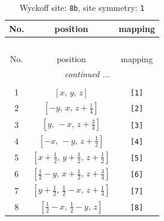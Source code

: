 \documentclass[fleqn,8pt]{jsarticle}
\begin{document}
\begin{longtable}{ccc}
\caption{Wyckoff site: {\tt 8b}, site symmetry: {\tt 1}}
 \\
 \hline \hline
No. & position & mapping \\ \hline \endfirsthead

\multicolumn{2}{l}{\tablename\ \thetable{}} \\
 \hline \hline
No. & position & mapping \\ \hline \endhead

 \hline \hline
\multicolumn{2}{r}{\footnotesize\it continued ...} \\ \endfoot

 \hline \hline
\multicolumn{2}{r}{} \\ \endlastfoot

1 & $\left[ x,\, y,\, z \right]$ & {\tt [1]} \\ \hline
2 & $\left[ - y,\, x,\, z + \frac{1}{4} \right]$ & {\tt [2]} \\ \hline
3 & $\left[ y,\, - x,\, z + \frac{3}{4} \right]$ & {\tt [3]} \\ \hline
4 & $\left[ - x,\, - y,\, z + \frac{1}{2} \right]$ & {\tt [4]} \\ \hline
5 & $\left[ x + \frac{1}{2},\, y + \frac{1}{2},\, z + \frac{1}{2} \right]$ & {\tt [5]} \\ \hline
6 & $\left[ \frac{1}{2} - y,\, x + \frac{1}{2},\, z + \frac{3}{4} \right]$ & {\tt [6]} \\ \hline
7 & $\left[ y + \frac{1}{2},\, \frac{1}{2} - x,\, z + \frac{1}{4} \right]$ & {\tt [7]} \\ \hline
8 & $\left[ \frac{1}{2} - x,\, \frac{1}{2} - y,\, z \right]$ & {\tt [8]} \\
\end{longtable}
\end{document}
